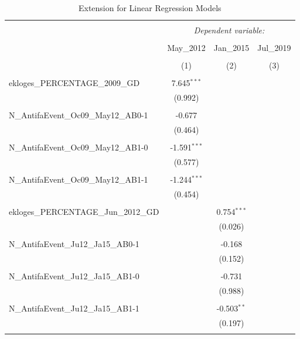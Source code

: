 \documentclass[12pt,letterpaper]{article}
\begin{document}
\begin{table}[!htbp] 
	\centering 
	\caption{Extension for Linear Regression Models} 
	\label{} 
	\setlength{\tabcolsep}{3pt}
	\tiny
	\begin{tabular}{@{\extracolsep{5pt}}lccc} 
		\\[-1.8ex]\hline 
		\hline \\[-1.8ex] 
		& \multicolumn{3}{c}{\textit{Dependent variable:}} \\ 
		\cline{2-4} 
		\\[-1.8ex] & \multicolumn{1}{c}{May\_2012} & \multicolumn{1}{c}{Jan\_2015} & \multicolumn{1}{c}{Jul\_2019} \\ 
		\\[-1.8ex] & \multicolumn{1}{c}{(1)} & \multicolumn{1}{c}{(2)} & \multicolumn{1}{c}{(3)}\\ 
		\hline \\[-1.8ex] 
		ekloges\_PERCENTAGE\_2009\_GD & 7.645$^{***}$ &  &  \\ 
		& (0.992) &  &  \\ 
		& & & \\ 
		N\_AntifaEvent\_Oc09\_May12\_AB0-1 & -0.677 &  &  \\ 
		& (0.464) &  &  \\ 
		& & & \\ 
		N\_AntifaEvent\_Oc09\_May12\_AB1-0 & -1.591$^{***}$ &  &  \\ 
		& (0.577) &  &  \\ 
		& & & \\ 
		N\_AntifaEvent\_Oc09\_May12\_AB1-1 & -1.244$^{***}$ &  &  \\ 
		& (0.454) &  &  \\ 
		& & & \\ 
		ekloges\_PERCENTAGE\_Jun\_2012\_GD &  & 0.754$^{***}$ &  \\ 
		&  & (0.026) &  \\ 
		& & & \\ 
		N\_AntifaEvent\_Ju12\_Ja15\_AB0-1 &  & -0.168 &  \\ 
		&  & (0.152) &  \\ 
		& & & \\ 
		N\_AntifaEvent\_Ju12\_Ja15\_AB1-0 &  & -0.731 &  \\ 
		&  & (0.988) &  \\ 
		& & & \\ 
		N\_AntifaEvent\_Ju12\_Ja15\_AB1-1 &  & -0.503$^{**}$ &  \\ 
		&  & (0.197) &  \\ 
		& & & \\ 

\end{tabular}
\end{table}
\end{document}
